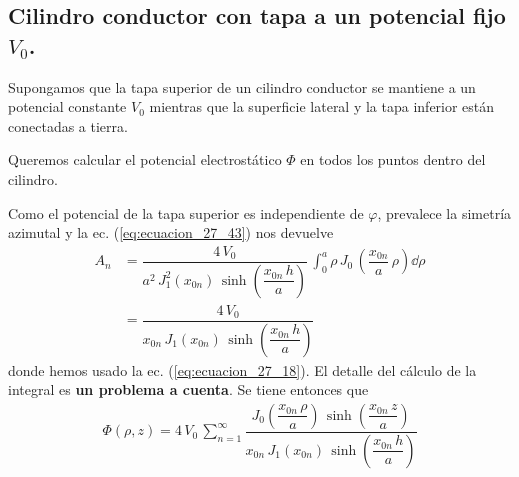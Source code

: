 \subsection{Cilindro conductor con tapa a un potencial fijo $V_{0}$.}
Supongamos que la tapa superior de un cilindro conductor se mantiene a un potencial constante $V_{0}$ mientras que la superficie lateral y la tapa inferior están conectadas a tierra.
\par
Queremos calcular el potencial electrostático $\Phi$ en todos los puntos dentro del cilindro.
\par
Como el potencial de la tapa superior es independiente de $\varphi$, prevalece la simetría azimutal y la ec. (\ref{eq:ecuacion_27_43}) nos devuelve
\begin{align*}
A_{n} &= \dfrac{4 \, V_{0}}{a^{2} \, J_{1}^{2} (x_{0n}) \, \sinh \left( \dfrac{x_{0n} \, h}{a} \right)} \, \int_{0}^{a} \rho \,  J_{0} \, \left( \dfrac{x_{0n}}{a}  \, \rho \right) \dd{\rho} \\[1em]
&= \dfrac{4 \, V_{0}}{x_{0n} \, J_{1} (x_{0n}) \, \sinh \left( \dfrac{x_{0n} \, h}{a} \right)}
\end{align*}
donde hemos usado la ec. (\ref{eq:ecuacion_27_18}). El detalle del cálculo de la integral es \textbf{un problema a cuenta}. Se tiene entonces que
\begin{align*}
\Phi (\rho, z) = 4 \, V_{0} \, \sum_{n=1}^{\infty} \dfrac{J_{0} \left( \dfrac{x_{0n} \, \rho}{a} \right) \, \sinh \left( \dfrac{x_{0n} \, z}{a} \right)}{{x_{0n} \, J_{1} (x_{0n}) \, \sinh \left( \dfrac{x_{0n} \, h}{a} \right)}}
\end{align*}
